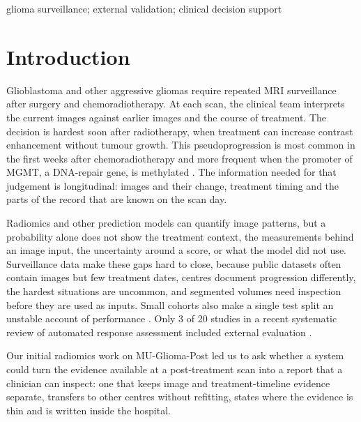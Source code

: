 \documentclass[largeformat]{interact} %
\begin{document}
\begin{keywords}
glioma surveillance; external validation; clinical decision support
\end{keywords}

\section{Introduction}\label{sec:1}

Glioblastoma and other aggressive gliomas require repeated MRI surveillance after surgery and chemoradiotherapy. At
each scan, the clinical team interprets the current images against earlier images and the course of treatment. The
decision is hardest soon after radiotherapy, when treatment can increase contrast enhancement without tumour growth.
This pseudoprogression is most common in the first weeks after chemoradiotherapy and more frequent when the promoter
of MGMT, a DNA-repair gene, is methylated \citep{taal2008,brandes2008}. The information needed for that judgement is
longitudinal: images and their change, treatment timing and the parts of the record that are known on the scan day.

Radiomics and other prediction models can quantify image patterns, but a probability alone does not show the
treatment context, the measurements behind an image input, the uncertainty around a score, or what the model did not
use. Surveillance data make these gaps hard to close, because public datasets often contain images but few treatment dates,
centres document progression differently, the hardest situations are uncommon, and segmented volumes need inspection
before they are used as inputs. Small cohorts also make a single test split an
unstable account of performance \citep{an2021,varoquaux2018}. Only 3 of 20 studies in a recent systematic review of
automated response assessment included external evaluation \citep{shi2025}.

Our initial radiomics work on MU-Glioma-Post led us to ask whether a system could turn the evidence available at a
post-treatment scan into a report that a clinician can inspect: one that keeps image and treatment-timeline evidence
separate, transfers to other centres without refitting, states where the evidence is thin and is written inside the
hospital.
\end{document}
